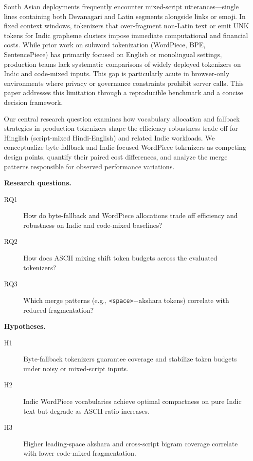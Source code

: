 \documentclass{article}
\renewcommand{\textvisiblespace}{\texttt{\textless{}space\textgreater{}}}
\begin{document}
South Asian deployments frequently encounter mixed-script utterances---single lines containing both Devanagari and Latin segments alongside links or emoji. In fixed context windows, tokenizers that over-fragment non-Latin text or emit UNK tokens for Indic grapheme clusters impose immediate computational and financial costs. While prior work on subword tokenization (WordPiece, BPE, SentencePiece) has primarily focused on English or monolingual settings, production teams lack systematic comparisons of widely deployed tokenizers on Indic and code-mixed inputs. This gap is particularly acute in browser-only environments where privacy or governance constraints prohibit server calls. This paper addresses this limitation through a reproducible benchmark and a concise decision framework.

Our central research question examines how vocabulary allocation and fallback strategies in production tokenizers shape the efficiency-robustness trade-off for Hinglish (script-mixed Hindi-English) and related Indic workloads. We conceptualize byte-fallback and Indic-focused WordPiece tokenizers as competing design points, quantify their paired cost differences, and analyze the merge patterns responsible for observed performance variations.

\noindent\textbf{Research questions.}
\begin{description}
    \item[RQ1] How do byte-fallback and WordPiece allocations trade off efficiency and robustness on Indic and code-mixed baselines?
    \item[RQ2] How does ASCII mixing shift token budgets across the evaluated tokenizers?
    \item[RQ3] Which merge patterns (e.g., {\textvisiblespace}+akshara tokens) correlate with reduced fragmentation?
\end{description}

\noindent\textbf{Hypotheses.}
\begin{description}
    \item[H1] Byte-fallback tokenizers guarantee coverage and stabilize token budgets under noisy or mixed-script inputs.
    \item[H2] Indic WordPiece vocabularies achieve optimal compactness on pure Indic text but degrade as ASCII ratio increases.
    \item[H3] Higher leading-space akshara and cross-script bigram coverage correlate with lower code-mixed fragmentation.
\end{description}
\end{document}
